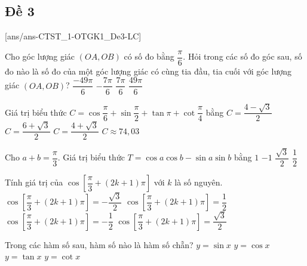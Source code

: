 \subsection{Đề 3}
[ans/ans-CTST_1-OTGK1_De3-LC]
\caulc
\begin{ex} %
	Cho góc lượng giác $(OA,OB)$ có số đo bằng $\dfrac{\pi}{6}$. Hỏi trong các số đo góc sau, số đo nào là số đo của một góc lượng giác có cùng tia đầu, tia cuối với góc lượng giác $(OA,OB)$?
	\choice
	{$\dfrac{-49\pi}{6}$}
	{$-\dfrac{7\pi}{6}$}
	{$\dfrac{7\pi}{6}$}
	{\True $\dfrac{49\pi}{6}$}
\end{ex}
\begin{ex}%
	Giá trị biểu thức $C=\cos \dfrac{\pi }{6}+\sin \dfrac{\pi }{2}+\tan \pi +\cot \dfrac{\pi }{4}$ bằng
	\choice
	{$C=\dfrac{4-\sqrt{3}}{2}$}
	{$C=\dfrac{6+\sqrt{3}}{2}$}
	{\True $C=\dfrac{4+\sqrt{3}}{2}$}
	{$C\approx 74{,}03$}
\end{ex}
\begin{ex}%
	Cho $a+b=\dfrac{\pi}{3}$. Giá trị biểu thức $T=\cos a\cos b-\sin a\sin b$ bằng
	\choice
	{$1$}
	{$-1$}
	{$\dfrac{\sqrt{3}}{2}$}
	{\True $\dfrac{1}{2}$}
\end{ex}
\begin{ex}%
	Tính giá trị của $\cos \left[ \dfrac{\pi }{3}+\left( 2k+1 \right)\pi \right]$ với $k$ là số nguyên.
	\choice
	{$\cos \left[ \dfrac{\pi }{3}+\left( 2k+1 \right)\pi \right]=-\dfrac{\sqrt{3}}{2}$}
	{$\cos \left[ \dfrac{\pi }{3}+\left( 2k+1 \right)\pi \right]=\dfrac{1}{2}$}
	{\True $\cos \left[ \dfrac{\pi }{3}+\left( 2k+1 \right)\pi \right]=-\dfrac{1}{2}$}
	{$\cos \left[ \dfrac{\pi }{3}+\left( 2k+1 \right)\pi \right]=\dfrac{\sqrt{3}}{2}$}
\end{ex}
\begin{ex}%
	Trong các hàm số sau, hàm số nào là hàm số chẵn?
	\choice
	{$y=\sin x$}
	{\True $y=\cos x$}
	{$y=\tan x$}
	{$y=\cot x$}
\end{ex}
